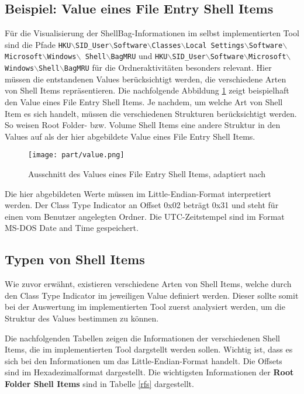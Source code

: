 \subsection{Beispiel: Value eines File Entry Shell Items}
\vspace{0.3cm}
Für die Visualisierung der ShellBag-Informationen im selbst implementierten  Tool sind die Pfade \texttt{HKU$\backslash$SID\_User$\backslash$Software$\backslash$Classes$\backslash$Local Settings$\backslash$Software$\backslash$Microsoft$\backslash$Windows$\backslash$ \newline Shell$\backslash$BagMRU} und \texttt{HKU$\backslash$SID\_User$\backslash$Software$\backslash$Microsoft$\backslash$Windows$\backslash$Shell$\backslash$BagMRU} für die Ordneraktivitäten besonders relevant. Hier müssen die entstandenen Values berücksichtigt werden, die verschiedene Arten von Shell Items repräsentieren. \newline
Die nachfolgende Abbildung \ref{img:value} zeigt beispielhaft den Value eines File Entry Shell Items. Je nachdem, um welche Art von Shell Item es sich handelt, müssen die verschiedenen Strukturen berücksichtigt werden. So weisen Root Folder- bzw. Volume Shell Items eine andere Struktur in den Values auf als der hier abgebildete Value eines File Entry Shell Items.

\begin{figure}[H]
	\centering
	\texttt{[image: part/value.png]}
	\caption{Ausschnitt des Values eines File Entry Shell Items, adaptiert nach \cite{lo2014windows}} 
	\label{img:value}
\end{figure}
Die hier abgebildeten Werte müssen im Little-Endian-Format interpretiert werden. Der Class Type Indicator an Offset 0x02 beträgt 0x31 und steht für einen vom Benutzer angelegten Ordner. Die UTC-Zeitstempel sind im Format MS-DOS Date and Time gespeichert. \cite{ba,shelltype} 

\subsection{Typen von Shell Items}
\vspace{0.3cm}
Wie zuvor erwähnt, existieren verschiedene Arten von Shell Items, welche durch den Class Type Indicator im jeweiligen Value definiert werden. Dieser sollte somit bei der Auswertung im implementierten Tool zuerst analysiert werden, um die Struktur des Values bestimmen zu können. 

Die nachfolgenden Tabellen zeigen die Informationen der verschiedenen Shell Items, die im implementierten Tool dargstellt werden sollen. Wichtig ist, dass es sich bei den Informationen um das Little-Endian-Format handelt. Die Offsets sind im Hexadezimalformat dargestellt. \newline
Die wichtigsten Informationen der \textbf{Root Folder Shell Items} sind in Tabelle \ref{rfs} dargestellt.

